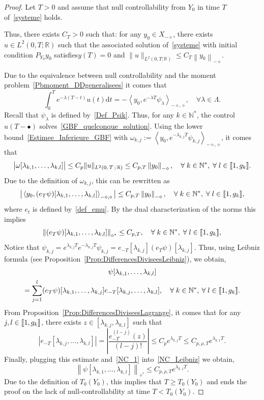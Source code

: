 \documentclass[10pt]{amsart}
\theoremstyle{definition}\newtheorem{defi}[theo]{Definition}\newtheorem{rema}[theo]{Remark}\newtheorem{exam}[theo]{Example}\newtheorem{exem}[theo]{Example}\newtheorem{nota}[theo]{Notation}
\newcommand{\llbracket}{\mathopen{[\mkern -2.7mu[}}
\newcommand{\rrbracket}{\mathclose{]\mkern -2.7mu]}}
\newcommand{\inter}[2]{\llbracket #1,#2 \rrbracket}
\newcommand{\Xmalpha}{X_{-\diamond}}
\newcommand{\Fzp}{Y_0}
\newcommand{\normeXalphas}[1]{\left\| #1 \right\|_{\diamond^*}}
\newcommand{\normeXmalpha}[1]{\left\| #1 \right\|_{-\diamond}}
\newcommand{\dual}[2]{\left\langle #1, #2 \right\rangle_{-\diamond,\diamond}}
\newcommand{\PF}{P_{\Fzp}}
\newcommand{\n}{g}
\newcommand{\N}{\mathbb{N}}
\newcommand{\R}{\mathbb{R}}
\newcommand{\md}{\mathrm{d}}
\renewcommand{\cdot}{{\scriptstyle \bullet}}
\let\oldforall\forall
\renewcommand*{\forall}{\mathrel{\oldforall}}
\begin{document}
\begin{proof}
Let $T>0$ and assume that null controllability from $\Fzp$ in time $T$ of~\eqref{systeme} holds.

Thus, there exists $C_T >0$ such that: for any $y_0 \in \Xmalpha$, there exists $u \in L^2(0,T ;\R)$ such that the associated solution of~\eqref{systeme} with initial condition $\PF y_0$ satisfies\linebreak$y(T)=0$ and $ \| u \|_{L^2(0,T ; \R)} \leq C_T \normeXmalpha{y_0}$.

Due to the equivalence between null controllability and the moment problem~\eqref{Pbmoment_DDgeneralisees} it comes that
\[
\int_0^T e^{-\lambda (T-t)} u(t) \md t = - \dual{y_0}{e^{-\lambda T} \psi_\lambda}, \quad \forall \lambda \in \Lambda.
\]
Recall that $\psi_\lambda$ is defined by~\eqref{Def_Psik}. Thus, for any $k \in \N^*$, the control $u(T-\cdot)$ solves~\eqref{GBF_quelconque_solution}. Using the lower bound~\eqref{Estimee_Inferieure_GBF} with $\omega_{k,j} := \dual{y_0}{e^{-\lambda_{k,j} T} \psi_{k,j}}$, it comes that
\[
\big| \omega[\lambda_{k,1}, \dots, \lambda_{k,l}] \big| \leq C_p \| u \|_{L^2(0,\,T\,;\,\R)} \leq C_{p,T} \normeXmalpha{y_0},
\quad \forall k \in \N^*, \; \forall l \in \inter{1}{\n_k}.
\]
Due to the definition of $\omega_{k,j}$, this can be rewritten as
\[
\big| \dual{y_0}{ (e_T \psi)[\lambda_{k,1}, \dots, \lambda_{k,l}]} \big| \leq C_{p,T} \normeXmalpha{y_0},
\quad \forall k \in \N^*, \; \forall l \in \inter{1}{\n_k},
\]
where $e_t$ is defined by~\eqref{def_emu}. By the dual characterization of the norms this implies
\begin{equation}\label{NC_1}
\normeXalphas{(e_T \psi)[\lambda_{k,1}, \dots, \lambda_{k,l}]} \leq C_{p,T},
\quad \forall k \in \N^*, \; \forall l \in \inter{1}{\n_k},
\end{equation}
Notice that $\psi_{k,j} = e^{\lambda_{k,j} T} e^{-\lambda_{k,j} T}\psi_{k,j} = e_{-T}[\lambda_{k,j}] (e_T \psi)[\lambda_{k,j}]$. Thus, using Leibniz formula (see Proposition~\ref{Prop:DifferencesDiviseesLeibniz}), we obtain,
\begin{multline}\label{NC_Leibniz}
\psi[\lambda_{k,1}, \dots, \lambda_{k,l}]\\
= \sum_{j=1}^l (e_T \psi)[\lambda_{k,1}, \dots, \lambda_{k,j}] e_{-T}[\lambda_{k,j}, \dots,\lambda_{k,l}],
\quad \forall k \in \N^*, \: \forall l \in \inter{1}{\n_k}.
\end{multline}
From Proposition~\ref{Prop:DifferencesDiviseesLagrange}, it comes that for any $j,l \in \inter{1}{\n_k}$, there exists $z \in [\lambda_{k,j}, \lambda_{k,l}]$ such that
\[
\left| e_{-T} [\lambda_{k,j}, \dots, \lambda_{k,l}] \right| = \left| \frac{e_{-T}^{(l-j)}(z)}{(l-j)!} \right| \leq C_p e^{\lambda_{k,j} T} \leq C_{p, \rho, T} e^{\lambda_{k,1} T}.
\]
Finally, plugging this estimate and~\eqref{NC_1} into~\eqref{NC_Leibniz} we obtain,
\[
\normeXalphas{\psi[\lambda_{k,1}, \dots, \lambda_{k,l}]} \leq C_{p, \rho, T} e^{\lambda_{k,1}T}.
\]
Due to the definition of $T_0(\Fzp)$, this implies that $T \geq T_0(\Fzp)$ and ends the proof on the lack of null-controllability at time $T<T_0(\Fzp)$.
\end{proof}
\end{document}
